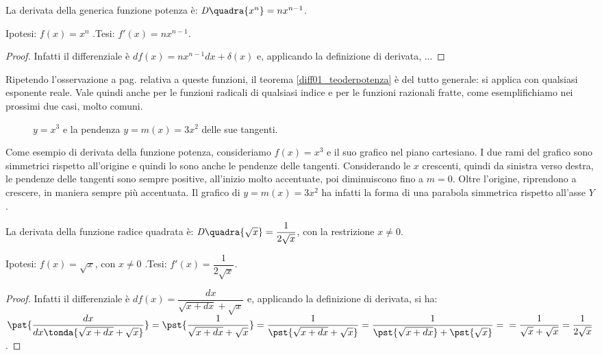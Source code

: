 \begin{teorema}
  \label{diff01_teoderpotenza}
  La derivata della generica funzione potenza è: $\mathit{D}\quadra{x^n}=
  nx^{n-1}$.
\end{teorema}
\noindent Ipotesi: $f(x)=x^n$ .\tab Tesi: $f'(x)=nx^{n-1}$.
\begin{proof}
  Infatti il differenziale è $df(x)=nx^{n-1}dx+ \delta(x)$ e,
  applicando la definizione di derivata, ...
\end{proof}

\begin{osservazione}
 Ripetendo l'osservazione a pag.\pageref{subsubsec:diff01_diffpot} relativa 
 a queste funzioni, il teorema \ref{diff01_teoderpotenza} è del tutto 
generale: si
 applica con qualsiasi esponente reale.
Vale quindi anche per le funzioni radicali di qualsiasi indice e per le 
funzioni
razionali fratte, come esemplifichiamo nei prossimi due casi, molto comuni.
\end{osservazione}

\begin{figure}[h!]
\begin{inaccessibleblock}
 \begin{center}
 \begin{minipage}[]{.48\textwidth}
 \cubica
 \end{minipage} 
 \hfill
 \begin{minipage}[]{.48\textwidth}
  \tangenticubica
 \end{minipage}
 \end{center}
\end{inaccessibleblock}
\caption{$y=x^3$ e la pendenza $y=m(x)=3x^2$ delle sue tangenti.} 
\label{}
\end{figure}
Come esempio di derivata della funzione potenza, consideriamo $f(x)=x^3$
e il suo grafico nel piano cartesiano. I due rami del grafico sono 
simmetrici
rispetto all'origine e quindi lo sono anche le pendenze delle tangenti. 
Considerando le $x$ crescenti, quindi da sinistra verso destra, le pendenze 
delle tangenti sono sempre positive, all'inizio molto accentuate, poi 
diminuiscono
fino a $m=0$. Oltre l'origine, riprendono a crescere, in maniera sempre più 
accentuata. Il grafico di $y=m(x)=3 x^2$ ha infatti la forma di una parabola
simmetrica rispetto all'asse $Y$.

\begin{corollario}
  La derivata della funzione radice quadrata è: 
$\mathit{D}\quadra{\sqrt{x}}=
    \dfrac{1}{2\sqrt{x}}$, con la restrizione $x\ne 0$.
\end{corollario}
\noindent Ipotesi: $f(x)=\sqrt{x}$, con $x\ne 0$ .\tab Tesi: 
    $f'(x)=\dfrac{1}{2\sqrt{x}}$.
\begin{proof}
  Infatti il differenziale è $df(x)=\dfrac{dx}{\sqrt{x+dx}+\sqrt{x}}$ e,
  applicando la definizione di derivata, si ha:\\
  $\pst{\dfrac{dx}{dx\tonda{\sqrt{x+dx}+\sqrt{x}}}}=
  \pst{\dfrac{1}{\sqrt{x+dx}+\sqrt{x}}}=
      \dfrac{1}{\pst{\sqrt{x+dx}+\sqrt{x}}}=
      \dfrac{1}{\pst{\sqrt{x+dx}}+\pst{\sqrt{x}}}=\\
      =\dfrac{1}{\sqrt{x}+\sqrt{x}}=\dfrac{1}{2\sqrt{x}}$.
\end{proof}

